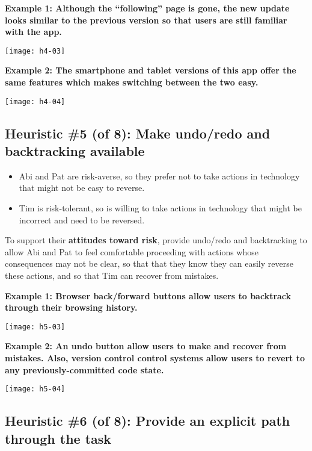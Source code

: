 \spacer
\noindent\textbf{Example 1: Although the ``following'' page is gone, the new update looks similar to the previous version so that users are still familiar with the app.}
\begin{center}
\noindent\texttt{[image: h4-03]}
\end{center}

\noindent\textbf{Example 2: The smartphone and tablet versions of this app offer the same features which makes switching between the two easy.}
\begin{center}
\noindent\texttt{[image: h4-04]}
\end{center}

\subsection{Heuristic \#5 (of 8): Make undo/redo and backtracking available}

\begin{itemize}
\item Abi and Pat are risk-averse, so they prefer not to take actions in technology that might not be easy to reverse.
\item Tim is risk-tolerant, so is willing to take actions in technology that might be incorrect and need to be reversed.
\end{itemize}

To support their \textbf{attitudes toward risk}, provide undo/redo and backtracking to allow Abi and Pat to feel comfortable proceeding with actions whose consequences may not be clear, so that that they know they can easily reverse these actions, and so that Tim can recover from mistakes.

\spacer
\noindent\textbf{Example 1: Browser back/forward buttons allow users to backtrack through their browsing history.}\\
\begin{center}
\noindent\texttt{[image: h5-03]}
\end{center}

\noindent\textbf{Example 2: An undo button allow users to make and recover from mistakes. Also, version control control systems allow users to revert to any previously-committed code state.}\\
\begin{center}
\noindent\texttt{[image: h5-04]}
\end{center}

\subsection{Heuristic \#6 (of 8): Provide an explicit path through the task}

